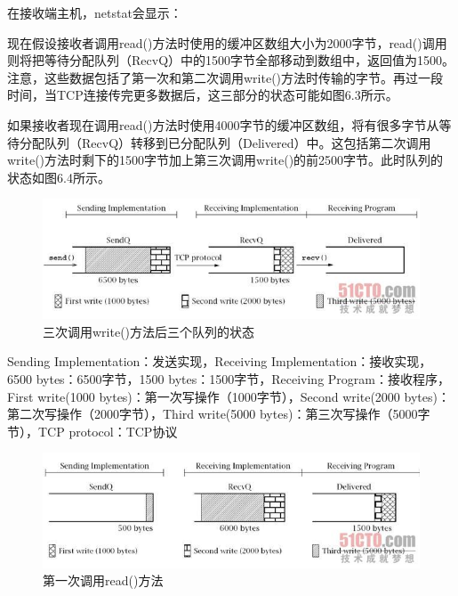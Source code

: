 	

	在接收端主机，netstat会显示：

	

	现在假设接收者调用read()方法时使用的缓冲区数组大小为2000字节，read()调用则将把等待分配队列（RecvQ）中的1500字节全部移动到数组中，返回值为1500。注意，这些数据包括了第一次和第二次调用write()方法时传输的字节。再过一段时间，当TCP连接传完更多数据后，这三部分的状态可能如图6.3所示。

	如果接收者现在调用read()方法时使用4000字节的缓冲区数组，将有很多字节从等待分配队列（RecvQ）转移到已分配队列（Delivered）中。这包括第二次调用write()方法时剩下的1500字节加上第三次调用write()的前2500字节。此时队列的状态如图6.4所示。

	\clearpage

	\begin{figure}[htbp]%
		\centering
		\includegraphics[scale=.6]{img/06.02.jpg}
		\caption{三次调用write()方法后三个队列的状态}
		\label{fig:tree.time.call.write.get.tree.query}
	\end{figure}

	Sending Implementation：发送实现，Receiving Implementation：接收实现，6500 bytes：6500字节，1500 bytes：1500字节，Receiving Program：接收程序，First write(1000 bytes)：第一次写操作（1000字节），Second write(2000 bytes)：第二次写操作（2000字节），Third write(5000 bytes)：第三次写操作（5000字节），TCP protocol：TCP协议

	\clearpage

	\begin{figure}[htbp]%
		\centering
		\includegraphics[scale=.6]{img/06.03.jpg}
		\caption{第一次调用read()方法}
		\label{fig:first.time.call.read.func}
	\end{figure}

